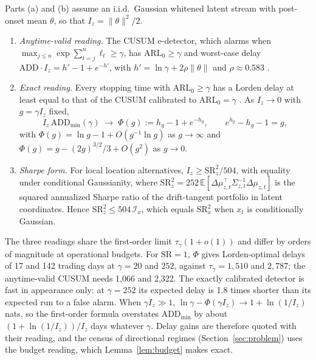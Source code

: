 \begin{proposition}\label{prop:floor}
Parts (a) and (b) assume an i.i.d.\ Gaussian whitened latent stream with post-onset mean $\theta$, so that $I_z=\|\theta\|^2/2$.
\begin{enumerate}[label=(\alph*),leftmargin=*,itemsep=1pt,topsep=2pt]
\item \emph{Anytime-valid reading.} The CUSUM e-detector, which alarms when $\max_{j\le n}\exp\sum_{t=j}^{n}\ell_t\ge\gamma$, has $\mathrm{ARL}_0\ge\gamma$ \citep{lorden_1971,shin_2024} and worst-case delay $\mathrm{ADD}\cdot I_z=h'-1+e^{-h'}$, with $h'=\ln\gamma+2\rho\|\theta\|$ and $\rho\approx0.583$ \citep{siegmund_1985}.
\item \emph{Exact reading.} Every stopping time with $\mathrm{ARL}_0\ge\gamma$ has a Lorden delay at least equal to that of the CUSUM calibrated to $\mathrm{ARL}_0=\gamma$ \citep{moustakides_1986}. As $I_z\to0$ with $g=\gamma I_z$ fixed,
\begin{equation}\label{eq:phi}
I_z\,\mathrm{ADD}_{\min}(\gamma)\;\to\;\Phi(g):=h_g-1+e^{-h_g},\qquad e^{h_g}-h_g-1=g ,
\end{equation}
with $\Phi(g)=\ln g-1+O(g^{-1}\ln g)$ as $g\to\infty$ and $\Phi(g)=g-(2g)^{3/2}/3+O(g^2)$ as $g\to0$.
\item \emph{Sharpe form.} For local location alternatives, $I_z\ge\mathrm{SR}_z^2/504$, with equality under conditional Gaussianity, where $\mathrm{SR}_z^2=252\,\mathbb{E}[\Delta\mu_{z,t}^{\top}\Sigma_{z,t}^{-1}\Delta\mu_{z,t}]$ is the squared annualized Sharpe ratio of the drift-tangent portfolio in latent coordinates. Hence $\mathrm{SR}_z^2\le504\,\mathcal{I}_x$, which equals $\mathrm{SR}_x^2$ when $x_t$ is conditionally Gaussian.
\end{enumerate}
\end{proposition}

The three readings share the first-order limit $\tau_\gamma(1+o(1))$ and differ by orders of magnitude at operational budgets. For $\mathrm{SR}=1$, $\Phi$ gives Lorden-optimal delays of 17 and 142 trading days at $\gamma=20$ and $252$, against $\tau_\gamma=1{,}510$ and $2{,}787$; the anytime-valid CUSUM needs 1{,}066 and 2{,}322. The exactly calibrated detector is fast in appearance only: at $\gamma=252$ its expected delay is 1.8 times shorter than its expected run to a false alarm. When $\gamma I_z\gg1$, $\ln\gamma-\Phi(\gamma I_z)\to1+\ln(1/I_z)$ nats, so the first-order formula overstates $\mathrm{ADD}_{\min}$ by about $(1+\ln(1/I_z))/I_z$ days whatever $\gamma$. Delay gains are therefore quoted with their reading, and the census of directional regimes (Section~\ref{sec:problem}) uses the budget reading, which Lemma~\ref{lem:budget} makes exact.

